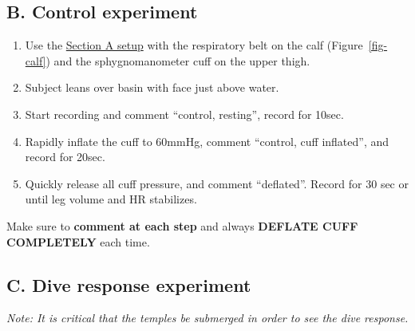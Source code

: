 \documentclass[
  letterpaper,
  DIV=11,
  numbers=noendperiod,
  oneside]{scrartcl}
\providecommand{\tightlist}{%
  \setlength{\itemsep}{0pt}\setlength{\parskip}{0pt}}\usepackage{longtable,booktabs,array}
\begin{document}
\hypertarget{b.-control-experiment}{%
\subsection{B. Control experiment}\label{b.-control-experiment}}

\begin{enumerate}
\def\labelenumi{\arabic{enumi}.}
\tightlist
\item
  Use the \href{@sec-divesetup}{Section A setup} with the respiratory
  belt on the calf (Figure~\ref{fig-calf}) and the sphygnomanometer cuff
  on the upper thigh.
\item
  Subject leans over basin with face just above water.
\item
  Start recording and comment {``control, resting''}, record for 10sec.
\item
  Rapidly inflate the cuff to 60mmHg, comment {``control, cuff
  inflated''}, and record for 20sec.\\
\item
  Quickly release all cuff pressure, and comment {``deflated''}. Record
  for 30 sec or until leg volume and HR stabilizes.
\end{enumerate}

{Make sure to \textbf{comment at each step} and always \textbf{DEFLATE
CUFF COMPLETELY} each time.}

\hypertarget{c.-dive-response-experiment}{%
\subsection{C. Dive response
experiment}\label{c.-dive-response-experiment}}

\emph{Note: It is critical that the temples be submerged in order to see
the dive response.}
\end{document}
